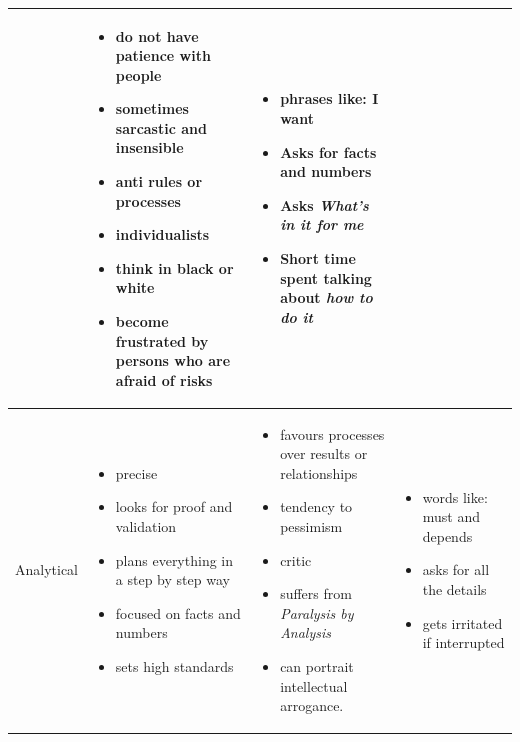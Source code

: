 \begin{table}[h]
\begin{tabular}{ | p{} | p{} | p{} | p{} |}
\begin{itemize}
      \end{itemize}
     &
      \begin{itemize}
       \item do not have patience with people
       \item sometimes sarcastic and insensible
       \item anti rules or processes
       \item individualists
       \item think in black or white
       \item become frustrated by persons who are afraid of risks
      \end{itemize}
     & 
     \begin{itemize}
      \item phrases like: I want
      \item Asks for facts and numbers
      \item Asks \textit {What's in it for me}
      \item Short time spent talking about \textit {how to do it}
     \end{itemize}
     \\ \hline
    Analytical
     &
      \begin{itemize}
       \item precise
       \item looks for proof and validation
       \item plans everything in a step by step way
       \item focused on facts and numbers
       \item sets high standards
      \end{itemize}
     &
      \begin{itemize}
       \item favours processes over results or relationships
       \item tendency to pessimism
       \item critic
       \item suffers from \textit{Paralysis by Analysis}
       \item can portrait intellectual arrogance.
      \end{itemize}
     &
      \begin{itemize}
       \item words like: must and depends
       \item asks for all the details
       \item gets irritated if interrupted

\end{itemize}
\end{tabular}
\end{table}
